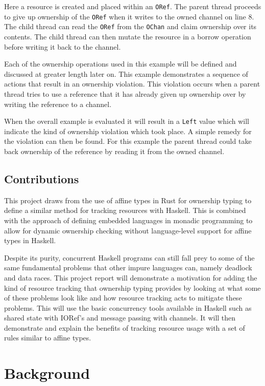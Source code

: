 \documentclass[onehalf,11pt]{beavtex}
\begin{document}
Here a resource is created and placed within an \texttt{ORef}.
The parent thread proceeds to give up ownership of the \texttt{ORef} when it
writes to the owned channel on line 8.
The child thread can read the \texttt{ORef} from the \texttt{OChan} and claim
ownership over its contents.
The child thread can then mutate the resource in a borrow operation before
writing it back to the channel. 

Each of the ownership operations used in this example will be defined
and discussed at greater length later on.
This example demonstrates a sequence of actions that result in an ownership
violation.
This violation occurs when a parent thread tries to use a reference that it
has already given up ownership over by writing the reference to a channel.

When the overall example is evaluated it will result in a \texttt{Left} value
which will indicate the kind of ownership violation which took place.
A simple remedy for the violation can then be found.
For this example the parent thread could take back ownership of the reference by
reading it from the owned channel.

\section{Contributions}

This project draws from the use of affine types in Rust for
ownership typing to define a similar method for tracking resources with Haskell.
This is combined with the approach of defining embedded languages in monadic
programming to allow for dynamic ownership checking without language-level
support for affine types in Haskell.

Despite its purity,
concurrent Haskell programs can still fall prey to some of the same fundamental
problems that other impure languages can, namely deadlock and data races.
This project report will demonstrate a motivation for adding the kind of
resource tracking that ownership typing provides by
looking at what some of these problems look like and how resource tracking acts
to mitigate these problems. %
This will use the basic concurrency tools available in Haskell
such as shared state with IORef's and message passing with channels.
It will then demonstrate and explain the benefits of tracking resource usage
with a set of rules similar to affine types.

\chapter{Background}
\end{document}
